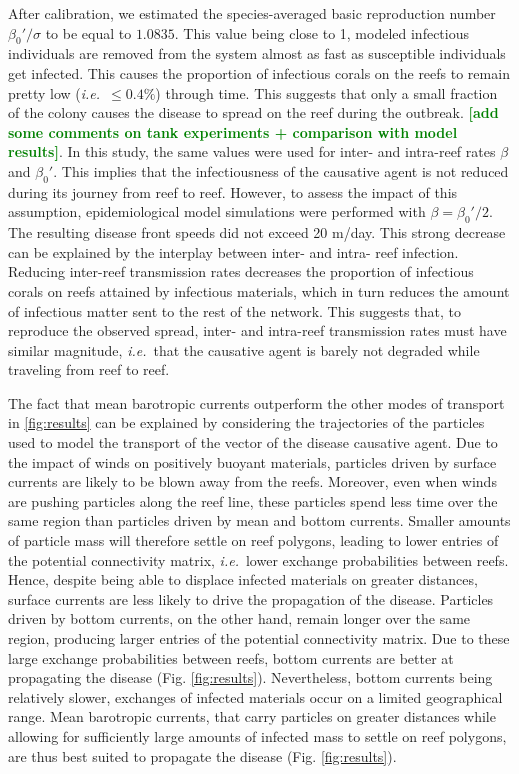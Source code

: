 \documentclass[utf8]{frontiersSCNS}
\newcommand{\ie}{{\it i.e.}\ }
\newcommand{\erinn}[1]{\textbf{\textcolor{green}{#1}}}
\newcommand{\dobby}[1]{\textbf{\color{violet}{#1}}}
\begin{document}
After calibration, we estimated the species-averaged basic reproduction number $\beta_0'/\sigma$ to be equal to $1.0835$. This value being close to 1, modeled infectious individuals are removed from the system almost as fast as susceptible individuals get infected. This causes the proportion of infectious corals on the reefs to remain pretty low (\ie $\leq 0.4\%$) through time. This suggests that only a small fraction of the colony causes the disease to spread on the reef during the outbreak. \erinn{[add some comments on tank experiments + comparison with model results]}. In this study, the same values were used for inter- and intra-reef rates $\beta$ and $\beta_0'$. This implies that the infectiousness of the causative agent is not reduced during its journey from reef to reef. However, to assess the impact of this assumption, epidemiological model simulations were performed with $\beta=\beta_0'/2$. The resulting disease front speeds did not exceed 20 m/day. This strong decrease can be explained by the interplay between inter- and intra- reef infection. Reducing inter-reef transmission rates decreases the proportion of infectious corals on reefs attained by infectious materials, which in turn reduces the amount of infectious matter sent to the rest of the network. This suggests that, to reproduce the observed spread, inter- and intra-reef transmission rates must have similar magnitude, \ie that the causative agent is barely not degraded while traveling from reef to reef. \dobby{Is this consistent with Rhodobacterales and Rhizobiales ?}


The fact that mean barotropic currents outperform the other modes of transport in \ref{fig:results} can be explained by considering the trajectories of the particles used to model the transport of the vector of the disease causative agent. Due to the impact of winds on positively buoyant materials, particles driven by surface currents are likely to be blown away from the reefs. Moreover, even when winds are pushing particles along the reef line, these particles spend less time over the same region than particles driven by mean and bottom currents. Smaller amounts of particle mass will therefore settle on reef polygons, leading to lower entries of the potential connectivity matrix, \ie lower exchange probabilities between reefs. Hence, despite being able to displace infected materials on greater distances, surface currents are less likely to drive the propagation of the disease. Particles driven by bottom currents, on the other hand, remain longer over the same region, producing larger entries of the potential connectivity matrix. Due to these large exchange probabilities between reefs, bottom currents are better at propagating the disease (Fig. \ref{fig:results}). Nevertheless, bottom currents being relatively slower, exchanges of infected materials occur on a limited geographical range. Mean barotropic currents, that carry particles on greater distances while allowing for sufficiently large amounts of infected mass to settle on reef polygons, are thus best suited to propagate the disease (Fig. \ref{fig:results}).
\end{document}
